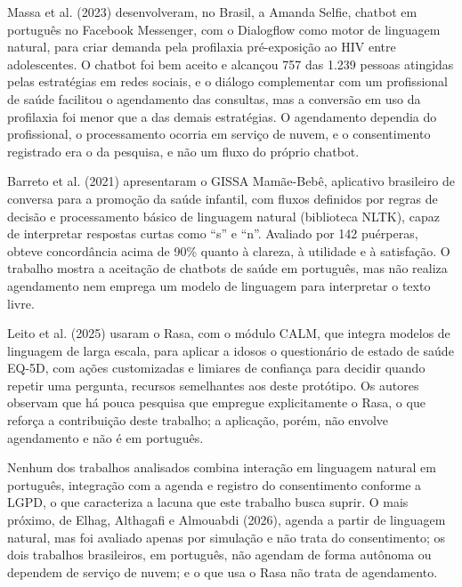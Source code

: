 \documentclass[12pt,a4paper]{extarticle}
\begin{document}
Massa et al. (2023) desenvolveram, no Brasil, a Amanda Selfie, chatbot em português no Facebook Messenger, com o Dialogflow como motor de linguagem natural, para criar demanda pela profilaxia pré-exposição ao HIV entre adolescentes. O chatbot foi bem aceito e alcançou 757 das 1.239 pessoas atingidas pelas estratégias em redes sociais, e o diálogo complementar com um profissional de saúde facilitou o agendamento das consultas, mas a conversão em uso da profilaxia foi menor que a das demais estratégias. O agendamento dependia do profissional, o processamento ocorria em serviço de nuvem, e o consentimento registrado era o da pesquisa, e não um fluxo do próprio chatbot.

Barreto et al. (2021) apresentaram o GISSA Mamãe-Bebê, aplicativo brasileiro de conversa para a promoção da saúde infantil, com fluxos definidos por regras de decisão e processamento básico de linguagem natural (biblioteca NLTK), capaz de interpretar respostas curtas como ``s'' e ``n''. Avaliado por 142 puérperas, obteve concordância acima de 90\% quanto à clareza, à utilidade e à satisfação. O trabalho mostra a aceitação de chatbots de saúde em português, mas não realiza agendamento nem emprega um modelo de linguagem para interpretar o texto livre.

Leito et al. (2025) usaram o Rasa, com o módulo CALM, que integra modelos de linguagem de larga escala, para aplicar a idosos o questionário de estado de saúde EQ-5D, com ações customizadas e limiares de confiança para decidir quando repetir uma pergunta, recursos semelhantes aos deste protótipo. Os autores observam que há pouca pesquisa que empregue explicitamente o Rasa, o que reforça a contribuição deste trabalho; a aplicação, porém, não envolve agendamento e não é em português.

Nenhum dos trabalhos analisados combina interação em linguagem natural em português, integração com a agenda e registro do consentimento conforme a LGPD, o que caracteriza a lacuna que este trabalho busca suprir. O mais próximo, de Elhag, Althagafi e Almouabdi (2026), agenda a partir de linguagem natural, mas foi avaliado apenas por simulação e não trata do consentimento; os dois trabalhos brasileiros, em português, não agendam de forma autônoma ou dependem de serviço de nuvem; e o que usa o Rasa não trata de agendamento.
\end{document}
